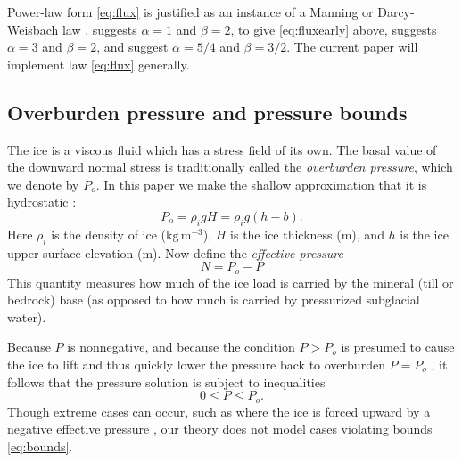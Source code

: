 \documentclass[11pt,final]{amsart}
\begin{document}
Power-law form \eqref{eq:flux} is justified as an instance of a Manning or Darcy-Weisbach law \citep{Schoofetal2012}.  \cite{Clarke05} suggests $\alpha=1$ and $\beta=2$, to give \eqref{eq:fluxearly} above, \cite{Hewitt2011} suggests $\alpha=3$ and $\beta = 2$, and \cite{Hewittetal2012} suggest $\alpha=5/4$ and $\beta=3/2$.  The current paper will implement law \eqref{eq:flux} generally.

\subsection*{Overburden pressure and pressure bounds}  The ice is a viscous fluid which has a stress field of its own.  The basal value of the downward normal stress is traditionally called the \emph{overburden pressure}, which we denote by $P_o$.  In this paper we make the shallow approximation that it is hydrostatic \citep{GreveBlatter2009}:
\begin{equation} \label{eq:hydrostatic}
  P_o = \rho_i g H = \rho_i g (h-b).
\end{equation}
Here $\rho_i$ is the density of ice ($\text{kg}\,\text{m}^{-3}$), $H$ is the ice thickness (m), and $h$ is the ice upper surface elevation (m).  Now define the \emph{effective pressure}
\begin{equation}
N = P_o - P\label{eq:effective}
\end{equation}
This quantity measures how much of the ice load is carried by the mineral (till or bedrock) base (as opposed to how much is carried by pressurized subglacial water).

Because $P$ is nonnegative, and because the condition $P>P_o$ is presumed to cause the ice to lift and thus quickly lower the pressure back to overburden $P=P_o$ \citep{Schoofetal2012}, it follows that the pressure solution is subject to inequalities
\begin{equation}
0 \le P \le P_o. \label{eq:bounds}
\end{equation}
Though extreme cases can occur, such as where the ice is forced upward by a negative effective pressure \citep{Schoofetal2012}, our theory does not model cases violating bounds \eqref{eq:bounds}.
\end{document}
